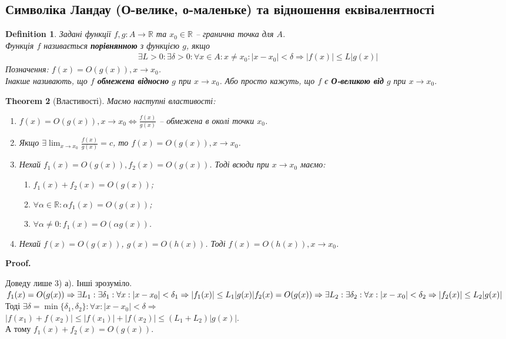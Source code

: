 \documentclass[a4paper, 14pt]{article}
\makeatletter
\def\qed{$\blacksquare$}
\theoremstyle{theoremdd}
\newtheorem{theorem}{Theorem}[subsection]
\theoremstyle{theoremdd}
\newtheorem{definition}[theorem]{Definition}
\theoremstyle{theoremdd}
\theoremstyle{theoremdd}
\theoremstyle{theoremdd}
\theoremstyle{theoremdd}
\theoremstyle{theoremdd}
\theoremstyle{theoremdd}
\renewenvironment{proof}[1][Proof.\\]{\par
\pushQED{\hfill \qed}%
\normalfont \topsep6\p@\@plus6\p@\relax
\trivlist
\item\relax
{\bfseries
#1\@addpunct{.}}\hspace\labelsep\ignorespaces
}{%
\popQED\endtrivlist\@endpefalse
}
\makeatother
\begin{document}
\subsection{Символіка Ландау (О-велике, о-маленьке) та відношення еквівалентності}
\begin{definition}
Задані функції $f,g \colon A \to \mathbb{R}$ та $x_0 \in \mathbb{R}$ -- гранична точка для $A$.\\
Функція $f$ називається \textbf{порівнянною} з функцією $g$, якщо
\begin{align*}
\exists L>0: \exists \delta > 0: \forall x \in A: x \neq x_0: |x-x_0| < \delta \Rightarrow |f(x)| \leq L |g(x)|
\end{align*}
Позначення: $f(x) = O(g(x)), x \to x_0$.\\
Інакше називають, що $f$ \textbf{обмежена відносно} $g$ при $x \to x_0$. Або просто кажуть, що $f$ є \textbf{О-великою від} $g$ при $x \to x_0$.
\end{definition}

\begin{theorem}[Властивості]
Маємо наступні властивості:
\begin{enumerate}[nosep,wide=0pt,label={\arabic*)}]
\item $f(x) = O(g(x)), x \to x_0 \iff \displaystyle \frac{f(x)}{g(x)}$ -- обмежена в околі точки $x_0$.
\item Якщо $\exists \displaystyle \lim_{x \to x_0} \frac{f(x)}{g(x)} = c$, то $f(x) = O(g(x)), x \to x_0$.
\item Нехай $f_1(x) = O(g(x)), f_2(x) = O(g(x))$. Тоді всюди при $x \to x_0$ маємо:
\begin{enumerate}[nosep,label={\alph*)}]
\item $f_1(x) + f_2(x) = O(g(x))$;
\item $\forall \alpha \in \mathbb{R}: \alpha f_1(x) = O(g(x))$;
\item $\forall \alpha \neq 0: f_1(x) = O(\alpha g(x))$.
\end{enumerate}
\item Нехай $f(x) = O(g(x))$, $g(x) = O(h(x))$. Тоді $f(x) = O(h(x)), x \to x_0$.
\end{enumerate}
\end{theorem}

\begin{proof}
Доведу лише 3) а). Інші зрозуміло.\\
$f_1(x) = O(g(x)) \Rightarrow \exists L_1: \exists \delta_1: \forall x : |x-x_0| < \delta_1 \Rightarrow |f_1(x)| \leq L_1 |g(x)| \\
f_2(x) = O(g(x)) \Rightarrow \exists L_2: \exists \delta_2: \forall x : |x-x_0| < \delta_2 \Rightarrow |f_2(x)| \leq L_2 |g(x)|$\\
Тоді $\exists \delta = \min\{\delta_1, \delta_2 \}: \forall x: |x-x_0|<\delta \Rightarrow$\\
$|f(x_1)+f(x_2)| \leq |f(x_1)|+|f(x_2)| \leq (L_1+L_2)|g(x)|$.\\
А тому $f_1(x) + f_2(x) = O(g(x))$.
\end{proof}
\end{document}
